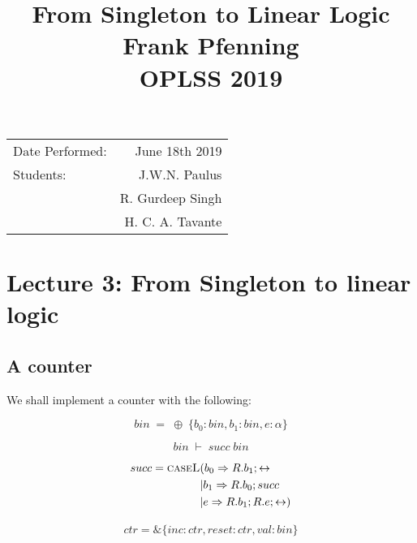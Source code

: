 \documentclass{article}
\title{From Singleton to Linear Logic \\ Frank Pfenning \\ OPLSS 2019} %
\begin{document}
	\date{}
	\maketitle %
	
	\begin{center}
		\begin{tabular}{l r}
			Date Performed: & June 18th 2019 \\ %
			Students: & J.W.N. Paulus  \\
			& R. Gurdeep Singh \\ %
			& H. C. A. Tavante
		\end{tabular}
	\end{center}
	
	
	\setcounter{section}{2} %
	\section{Lecture 3: From Singleton to linear logic}
	\subsection{A counter}
	
	We shall implement a counter with the following:
	
	\[
	\; bin\; =\; \oplus\; \{ b_0: bin, b_1:bin, e:\alpha \}\; 
	\]
	
	\[
	\; bin\; \vdash\; succ\; bin\; 
	\]
	
	\begin{align}
	succ = \textsc{caseL}&( b_0 \Rightarrow R . b_1; \leftrightarrow \\
	&| b_1 \Rightarrow R . b_0; succ \\
	&| e \Rightarrow R . b_1; R . e; \leftrightarrow )
	\end{align}
	
	\begin{equation}
	\begin{split}
	ctr = \& \{ inc:ctr, reset:ctr, val:bin \}
	\end{split}
	\end{equation}
	
\end{document}
